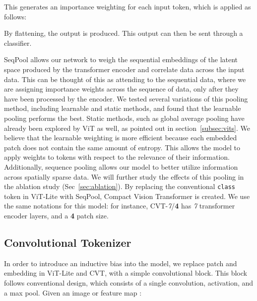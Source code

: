 \documentclass[10pt,twocolumn,letterpaper]{article}
\begin{document}
This generates an importance weighting for each input token, which is applied as follows:

By flattening, the output  is produced. This output can then be sent through a classifier.

SeqPool allows our network to weigh the sequential embeddings of the latent space produced by the transformer encoder and correlate data across the input data.
This can be thought of this as attending to the sequential data, where we are assigning importance weights across the sequence of data, only after they have been processed by the encoder.
We tested several variations of this pooling method, including learnable and static methods, and found that the learnable pooling performs the best. Static methods, such as global average pooling have already been explored by ViT as well, as pointed out in section~\ref{subsec:vits}.
We believe that the learnable weighting is more efficient because each embedded patch does not contain the same amount of entropy.
This allows the model to apply weights to tokens with respect to the relevance of their information.
Additionally, sequence pooling allows our model to better utilize information across spatially sparse data.
We will further study the effects of this pooling in the ablation study (Sec~\ref{sec:ablation}).
By replacing the conventional \verb|class| token in ViT-Lite with SeqPool, Compact Vision Transformer is created. We use the same notations for this model: for instance, CVT-\textit{7}/\textbf{4} has \textit{7} transformer encoder layers, and a \textbf{4} patch size.

\subsection{Convolutional Tokenizer}
\label{sec:method-tokenizer}
In order to introduce an inductive bias into the model, we replace patch and embedding in ViT-Lite and CVT, with a simple convolutional block.
This block follows conventional design, which consists of a single convolution,  activation, and a max pool. Given an image or feature map :
\end{document}
